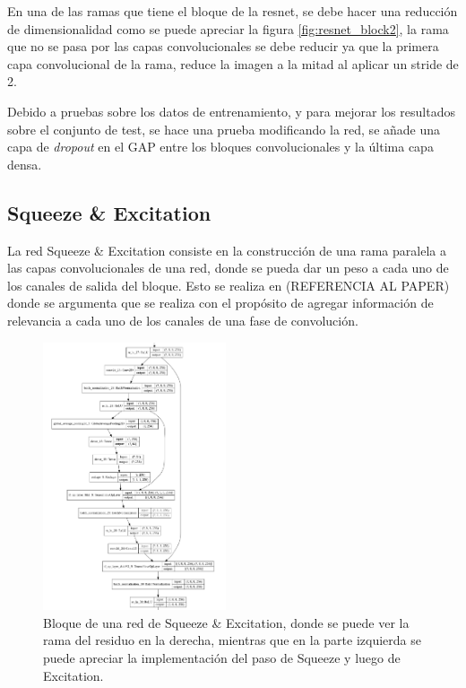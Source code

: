         En una de las ramas que tiene el bloque de la resnet, se debe hacer una reducción de dimensionalidad como se puede apreciar la figura \ref{fig:resnet_block2}, la rama que no se pasa por las capas convolucionales se debe reducir ya que la primera capa convolucional de la rama, reduce la imagen a la mitad al aplicar un stride de 2.
        
        Debido a pruebas sobre los datos de entrenamiento, y para mejorar los resultados sobre el conjunto de test, se hace una prueba modificando la red, se añade una capa de \textit{dropout} en el GAP entre los bloques convolucionales y la última capa densa.
        
    \subsection{Squeeze \& Excitation}
    
        La red Squeeze \& Excitation consiste en la construcción de una rama paralela a las capas convolucionales de una red, donde se pueda dar un peso a cada uno de los canales de salida del bloque. Esto se realiza en (REFERENCIA AL PAPER) donde se argumenta que se realiza con el propósito de agregar información de relevancia a cada uno de los canales de una fase de convolución.
        
        \begin{figure}[t]
            \centering
            \includegraphics[width=0.48\textwidth]{img/squeeze_layer.png}
            \caption{Bloque de una red de Squeeze \& Excitation, donde se puede ver la rama del residuo en la derecha, mientras que en la parte izquierda se puede apreciar la implementación del paso de Squeeze y luego de Excitation.}
            \label{fig:squeeze_block}
        \end{figure}
        
